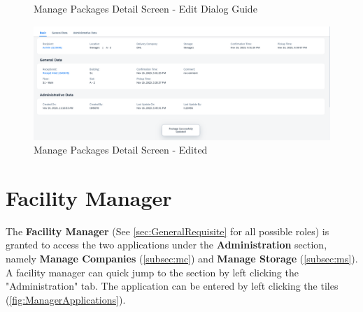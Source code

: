 \begin{figure}[htb!]
    \hspace{5pt}
    \caption{Manage Packages Detail Screen - Edit Dialog Guide}
	\label{fig:MPDetailEditBtn}
\end{figure}

\begin{figure}[H]
	\centering
	\includegraphics[width=1\linewidth]{images/user_doc/managePack/DetailScreen/edit/editToast.png}
	\caption{Manage Packages Detail Screen - Edited}
	\label{fig:MPReportEditDone}
\end{figure}


\section{Facility Manager}
\label{sec:UdocFacilityManager}

The \textbf{Facility Manager} (See \autoref{sec:GeneralRequisite} for all possible roles) is granted to access the two applications under the \textbf{Administration} section, namely \textbf{Manage Companies} (\autoref{subsec:mc}) and \textbf{Manage Storage} (\autoref{subsec:ms}). 
A facility manager can quick jump to the section by left clicking the "Administration" tab. The application can be entered by left clicking the tiles (\autoref{fig:ManagerApplications}).

